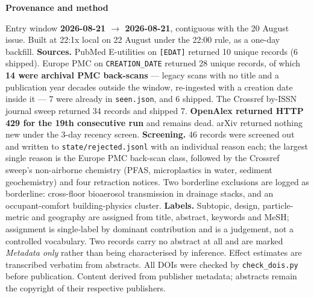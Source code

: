 \documentclass[10pt]{article}
\begin{document}


\vspace{4mm}
\begin{keybox}
{\sffamily\bfseries\footnotesize\color{Deep}Provenance and method}\\[1.2mm]
{\fontsize{7.2}{8.8}\selectfont
Entry window \textbf{2026-08-21 $\rightarrow$ 2026-08-21}, contiguous with the 20 August
issue. Built at 22:1x local on 22 August under the 22:00 rule, as a one-day backfill.
\textbf{Sources.} PubMed E-utilities on \texttt{[EDAT]} returned 10 unique records
(6 shipped). Europe PMC on \texttt{CREATION\_DATE} returned 28 unique records, of which
\textbf{14 were archival PMC back-scans} --- legacy scans with no title and a publication
year decades outside the window, re-ingested with a creation date inside it --- 7 were
already in \texttt{seen.json}, and 6 shipped. The Crossref by-ISSN journal sweep returned
34 records and shipped 7. \textbf{OpenAlex returned HTTP 429 for the 19th consecutive
run} and remains dead. arXiv returned nothing new under the 3-day recency screen.
\textbf{Screening.} 46 records were screened out and written to
\texttt{state/rejected.jsonl} with an individual reason each; the largest single reason
is the Europe PMC back-scan class, followed by the Crossref sweep's non-airborne
chemistry (PFAS, microplastics in water, sediment geochemistry) and four retraction
notices. Two borderline exclusions are logged as borderline: cross-floor bioaerosol
transmission in drainage stacks, and an occupant-comfort building-physics cluster.
\textbf{Labels.} Subtopic, design, particle-metric and geography are assigned from title,
abstract, keywords and MeSH; assignment is single-label by dominant contribution and is a
judgement, not a controlled vocabulary. Two records carry no abstract at all and are
marked \textit{Metadata only} rather than being characterised by inference.
Effect estimates are transcribed verbatim from abstracts.
All DOIs were checked by \texttt{check\_dois.py} before publication. Content derived from
publisher metadata; abstracts remain the copyright of their respective publishers.\par}
\end{keybox}
\end{document}
